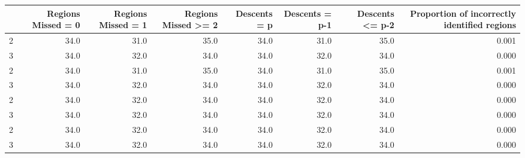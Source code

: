 \begin{tabular}{lrrrrrrr}
\toprule
{} &  Regions Missed = 0 &  Regions Missed = 1 &  Regions Missed >= 2 &  Descents = p &  Descents = p-1 &  Descents <= p-2 &  Proportion of incorrectly identified regions \\
\midrule
2 &                34.0 &                31.0 &                 35.0 &          34.0 &            31.0 &             35.0 &                                         0.001 \\
3 &                34.0 &                32.0 &                 34.0 &          34.0 &            32.0 &             34.0 &                                         0.000 \\
2 &                34.0 &                31.0 &                 35.0 &          34.0 &            31.0 &             35.0 &                                         0.001 \\
3 &                34.0 &                32.0 &                 34.0 &          34.0 &            32.0 &             34.0 &                                         0.000 \\
2 &                34.0 &                32.0 &                 34.0 &          34.0 &            32.0 &             34.0 &                                         0.000 \\
3 &                34.0 &                32.0 &                 34.0 &          34.0 &            32.0 &             34.0 &                                         0.000 \\
2 &                34.0 &                32.0 &                 34.0 &          34.0 &            32.0 &             34.0 &                                         0.000 \\
3 &                34.0 &                32.0 &                 34.0 &          34.0 &            32.0 &             34.0 &                                         0.000 \\
\bottomrule
\end{tabular}
